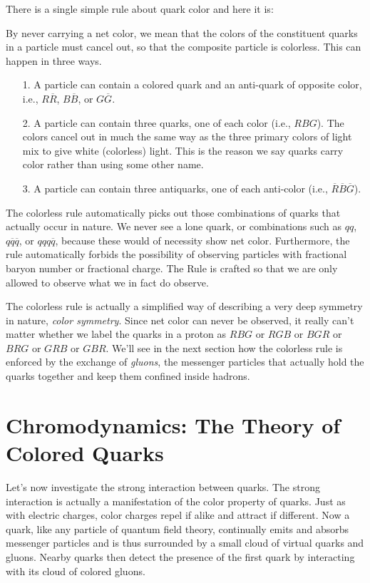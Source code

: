 There is a single simple rule about quark color and here it is:


By never carrying a net color, we mean that the colors of the
constituent quarks in a particle must cancel out, so that the
composite particle is colorless.  This can happen in three ways.
\begin{itemize}
\item[1.] A particle can contain a colored quark and an anti-quark of
  opposite color, i.e., $R\overline R$, $B\overline B$, or $G\overline G$.
\item[2.] A particle can contain three quarks, one of each color
  (i.e., $RBG$).  The colors cancel out in much the same way as the
  three primary colors of light mix to give white (colorless) light.
  This is the reason we say quarks carry color rather than using some
  other name.
\item[3.] A particle can contain three antiquarks, one of each
  anti-color (i.e., $\overline R\overline B\overline G$).
\end{itemize}

The colorless rule automatically picks out those combinations of
quarks that actually occur in nature.  We never see a lone quark, or
combinations such as $qq$, $q\overline q\overline q$, or $qqq\overline
q$, because these would of necessity show net color.  Furthermore, the
rule automatically forbids the possibility of observing particles with
fractional baryon number or fractional charge.  The Rule is crafted so
that we are only allowed to observe what we in fact do observe.

The colorless rule is actually a simplified way of describing a very
deep symmetry in nature, {\em color symmetry}.  Since net color can
never be observed, it really can't matter whether we label the quarks
in a proton as $RBG$ or $RGB$ or $BGR$ or $BRG$ or $GRB$ or $GBR$.
We'll see in the next section how the colorless rule is enforced by
the exchange of {\em gluons}, the messenger particles that actually
hold the quarks together and keep them confined inside hadrons.

\section[Chromodynamics]{Chromodynamics: The Theory of Colored Quarks}
\label{sec:chromodynamics}

Let's now investigate the strong interaction between quarks.  The
strong interaction is actually a manifestation of the color property
of quarks. Just as with electric charges, color charges repel if alike
and attract if different.  Now a quark, like any particle of quantum
field theory, continually emits and absorbs messenger particles and is
thus surrounded by a small cloud of virtual quarks and gluons. Nearby
quarks then detect the presence of the first quark by interacting with
its cloud of colored gluons.

